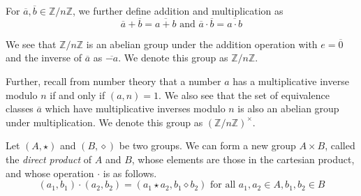 For $\overline{a}, \overline{b}\in \mathbb{Z}/n\mathbb{Z}$, we further define addition and multiplication as
$$\overline{a}+\overline{b}=\overline{a+b}\text{ and }\overline{a}\cdot\overline{b}=\overline{a\cdot b}$$

We see that $\mathbb{Z}/n\mathbb{Z}$ is an abelian group under the addition operation with $e=\overline{0}$ and the inverse of $\overline{a}$ as $\overline{-a}$. We denote this group as $\mathbb{Z}/n\mathbb{Z}$.

Further, recall from number theory that a number $a$ has a multiplicative inverse modulo $n$ if and only if $(a,n)=1$. We also see that the set of equivalence classes $\overline{a}$ which have multiplicative inverses modulo $n$ is also an abelian group under multiplication. We denote this group as $(\mathbb{Z}/n\mathbb{Z})^\times$.


\begin{definition}
    Let $(A,\star)$ and $(B,\diamond)$ be two groups. We can form a new group $A\times B$, called the \textit{direct product} of $A$ and $B$, whose elements are those in the cartesian product, and whose operation $\cdot$ is as follows.
    $$(a_1,b_1)\cdot(a_2,b_2)=(a_1\star a_2, b_1\diamond b_2)\text{ for all }a_1,a_2\in A, b_1,b_2\in B$$
\end{definition}

